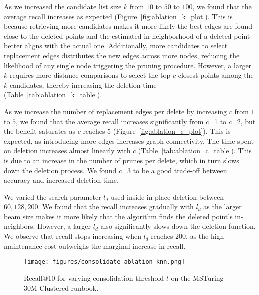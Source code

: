 As we increased the candidate list size $k$ from $10$ to $50$ to $100$, we found that the
average recall increases as expected (Figure~\ref{fig:ablation_k_plot}).
This is because retrieving more candidates makes it more likely the best
edges are found close to the deleted points and the estimated in-neighborhood
of a deleted point better aligns with the actual one. Additionally,
 more candidates to select replacement edges distributes the new edges across more nodes,
 reducing the likelihood of any single node triggering the pruning procedure. 
However, a larger $k$ requires more distance comparisons to select the top-$c$
closest points among the $k$ candidates, thereby increasing the deletion time (Table~\ref{tab:ablation_k_table}).


As we increase the number of replacement edges per delete by increasing
$c$ from $1$ to $5$, we found that the average recall increases significantly
from $c$=1 to $c$=2, but the benefit saturates as $c$ reaches $5$ (Figure~\ref{fig:ablation_c_plot}).
This  is expected, as introducing more edges increases graph connectivity.
The time spent on deletion increases almost linearly with $c$  (Table~\ref{tab:ablation_c_table}).
This is due to an increase in the number of prunes per delete, which in turn slows down the deletion process.
We found $c$=3 to be a good trade-off between accuracy and increased deletion time.


We varied the search parameter $l_d$ used inside in-place deletion between $60,128,200$.
We  found that the recall increases gradually with $l_d$ as the  larger beam size 
makes it more likely that the algorithm  finds the deleted point's in-neighbors.
However, a larger $l_d$ also significantly slows down the deletion function.
We observe that recall stops increasing when $l_d$ reaches $200$,
as the high maintenance cost outweighs the marginal increase in recall.



\begin{figure}
    \texttt{[image: figures/consolidate\_ablation\_knn.png]}
    \vspace{-10pt}
    \caption{Recall@10 for varying consolidation threshold $t$ on the MSTuring-30M-Clustered runbook.}
    \label{fig:ablation_t_plot}
\end{figure}

